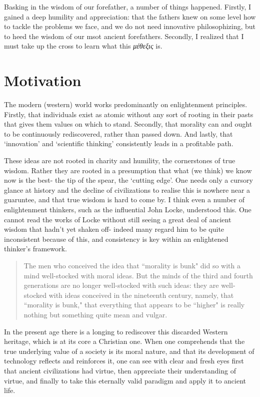 \documentclass[letterpaper]{article}
\begin{document}
Basking in the wisdom of our forefather, a number of things happened. Firstly, I gained a deep humility and appreciation: that the fathers knew on some level how to tackle the problems we face, and we do not need innovative philosophizing, but to heed the wisdom of our msot ancient forefathers. Secondly, I realized that I must take up the cross to learn what this \textit{μέθεξις} is.

\section{Motivation}

The modern (western) world works predominantly on enlightenment principles. Firstly, that individuals exist as atomic without any sort of rooting in their pasts that gives them values on which to stand. Secondly, that morality can and ought to be continuously rediscovered, rather than passed down. And lastly, that `innovation' and `scientific thinking' consistently leads in a profitable path.

These ideas are not rooted in charity and humility, the cornerstones of true wisdom. Rather they are rooted in a presumption that what (we think) we know now is the best- the tip of the spear, the `cutting edge'. One needs only a cursory glance at history and the decline of civilizations to realise this is nowhere near a guaruntee, and that true wisdom is hard to come by. I think even a number of enlightenment thinkers, such as the influential John Locke, understood this. One cannot read the works of Locke without still seeing a great deal of ancient wisdom that hadn't yet shaken off- indeed many regard him to be quite inconsistent because of this, and consistency is key within an enlightened thinker's framework.

\begin{quote}
  The men who conceived the idea that ``morality is bunk" did so with a mind well-stocked with moral ideas. But the minds of the third and fourth generations are no longer well-stocked with such ideas: they are well-stocked with ideas conceived in the nineteenth century, namely, that ``morality is bunk," that everything that appears to be ``higher" is really nothing but something quite mean and vulgar.
\end{quote}

In the present age there is a longing to rediscover this discarded Western heritage, which is at its core a Christian one. When one comprehends that the true underlying value of a society is its moral nature, and that its development of technology reflects and reinforces it, one can see with clear and fresh eyes first that ancient civilizations had virtue, then appreciate their understanding of virtue, and finally to take this eternally valid paradigm and apply it to ancient life.
\end{document}
